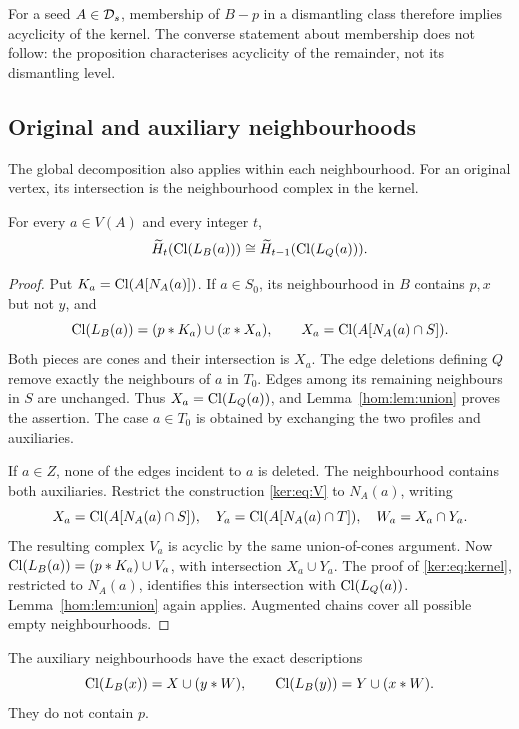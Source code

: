 For a seed \(A\in\mathcal D_s\), membership of \(B-p\) in a dismantling
class therefore implies acyclicity of the kernel. The converse
statement about membership does not follow: the proposition
characterises acyclicity of the remainder, not its dismantling level.

\subsection{Original and auxiliary neighbourhoods}

The global decomposition also applies within each neighbourhood. For an original vertex, its intersection is the neighbourhood complex in the kernel.

\begin{theorem}\label{ker:thm:original-links}
For every \(a\in V(A)\) and every integer \(t\),
\[
 \widetilde H_t(\operatorname{Cl}(L_B(a)))
 \cong \widetilde H_{t-1}(\operatorname{Cl}(L_Q(a))).
\]
\end{theorem}
\begin{proof}
Put \(K_a=\operatorname{Cl}(A[N_A(a)])\).
If \(a\in S_0\), its neighbourhood in \(B\) contains \(p,x\) but
not \(y\), and
\[
 \operatorname{Cl}(L_B(a))=(p*K_a)\cup(x*X_a),\qquad
 X_a=\operatorname{Cl}(A[N_A(a)\cap S]).
\]
Both pieces are cones and their intersection is \(X_a\).
The edge deletions defining \(Q\) remove exactly the neighbours
of \(a\) in \(T_0\). Edges among its remaining neighbours in \(S\)
are unchanged. Thus \(X_a=\operatorname{Cl}(L_Q(a))\), and
Lemma~\ref{hom:lem:union} proves the assertion. The case \(a\in T_0\)
is obtained by exchanging the two profiles and auxiliaries.

If \(a\in Z\), none of the edges incident to \(a\) is deleted.
The neighbourhood contains both auxiliaries. Restrict the
construction \eqref{ker:eq:V} to \(N_A(a)\), writing
\[
 X_a=\operatorname{Cl}(A[N_A(a)\cap S]),\quad
 Y_a=\operatorname{Cl}(A[N_A(a)\cap T]),\quad
 W_a=X_a\cap Y_a .
\]
The resulting complex \(V_a\) is acyclic by the same union-of-cones
argument. Now \(\operatorname{Cl}(L_B(a))=(p*K_a)\cup V_a\), with intersection
\(X_a\cup Y_a\). The proof of \eqref{ker:eq:kernel}, restricted to
\(N_A(a)\), identifies this intersection with \(\operatorname{Cl}(L_Q(a))\).
Lemma~\ref{hom:lem:union} again applies.
Augmented chains cover all possible empty neighbourhoods.
\end{proof}

The auxiliary neighbourhoods have the exact descriptions
\begin{equation}\label{ker:eq:auxiliary-complexes}
 \operatorname{Cl}(L_B(x))=X\cup(y*W),\qquad
 \operatorname{Cl}(L_B(y))=Y\cup(x*W).
\end{equation}
They do not contain \(p\).

